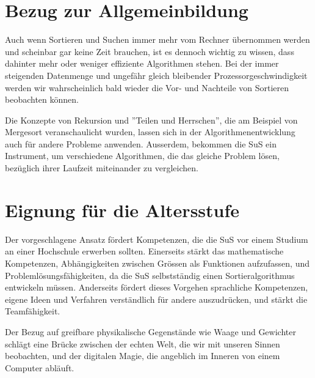 \documentclass[
	12pt, %
	german, %
]{fphw}
\begin{document}
\section*{Bezug zur Allgemeinbildung}
Auch wenn Sortieren und Suchen immer mehr vom Rechner übernommen werden und scheinbar gar keine Zeit brauchen, ist es dennoch wichtig zu wissen, dass dahinter mehr oder weniger effiziente Algorithmen stehen. Bei der immer steigenden Datenmenge und ungefähr gleich bleibender Prozessorgeschwindigkeit werden wir wahrscheinlich bald wieder die Vor- und Nachteile von Sortieren beobachten können.

Die Konzepte von Rekursion und ''Teilen und Herrschen'', die  am Beispiel von Mergesort veranschaulicht wurden, lassen sich in der Algorithmenentwicklung auch für andere Probleme anwenden. Ausserdem, bekommen die SuS ein Instrument, um verschiedene Algorithmen, die das gleiche Problem lösen, bezüglich ihrer Laufzeit miteinander zu vergleichen.


\section*{Eignung für die Altersstufe}
Der vorgeschlagene Ansatz fördert Kompetenzen, die die SuS vor einem Studium an einer Hochschule erwerben sollten. Einerseits stärkt das mathematische Kompetenzen, Abhängigkeiten zwischen Grössen als Funktionen aufzufassen, und Problemlösungsfähigkeiten, da die SuS selbstständig einen Sortieralgorithmus entwickeln müssen. Anderseits fördert dieses Vorgehen sprachliche Kompetenzen, eigene Ideen und Verfahren verständlich für andere auszudrücken, und stärkt die Teamfähigkeit.

Der Bezug auf greifbare physikalische Gegenstände wie Waage und Gewichter schlägt eine Brücke zwischen der echten Welt, die wir mit unseren Sinnen beobachten, und der digitalen Magie, die angeblich im Inneren von einem Computer abläuft.
\end{document}

